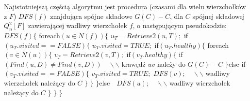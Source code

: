 \documentclass{pracamgr}
\begin{document}
    Najistotniejszą częścią algorytmu jest procedura (czasami dla wielu wierzchołków z $F$) $DFS(f)$ znajdująca spójne składowe $G(C)-C$,
    dla $C$ spójnej składowej $Q_n^2[F]$ zawierającej wadliwy wierzchołek $f$, o następującym pseudokodzie:\newline\newline    
    \hspace*{0pt}$DFS(f)\{$\newline
    \hspace*{16pt}	foreach$(u\in N(f))\{$\newline
    \hspace*{32pt}		$u_T=Retrieve2(u,T);$\newline
    \hspace*{32pt}		if$(u_T.visited==FALSE)\{$\newline
    \hspace*{48pt}			$u_T.visited=TRUE;$\newline
    \hspace*{48pt}			if$(u_T.healthy)\{$\newline
    \hspace*{64pt}				foreach$(v\in N(u))\{$\newline
    \hspace*{80pt}					$v_T=Retrieve2(v,T);$\newline
    \hspace*{80pt}					if$(v_T.healthy)\{$\newline
    \hspace*{96pt}						if$(Find(u,D)\neq Find(v,D))\quad\backslash\backslash$ krawędź $uv$ należy do $G(C)-C$\newline
    \hspace*{80pt}					$\}$else if$(v_T.visited==FALSE)\{$\newline
    \hspace*{96pt}						$v_T.visited=TRUE;$\newline
    \hspace*{96pt}						$DFS(v);\quad\backslash\backslash$ wadliwy wierzchołek należący do $C$\newline
    \hspace*{80pt}					$\}$\newline
    \hspace*{64pt}				$\}$\newline
    \hspace*{48pt}			$\}$else$\quad DFS(u);\quad\backslash\backslash$ wadliwy wierzchołek należący do $C$\newline
    \hspace*{32pt}		$\}$\newline
    \hspace*{16pt}	$\}$\newline
    \hspace*{0pt}$\}$\newline
    
\end{document}

